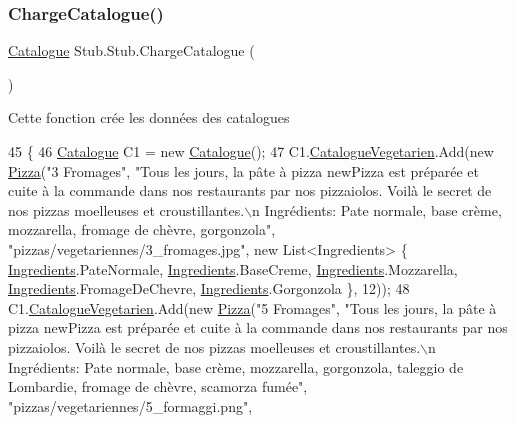 \subsubsection{\texorpdfstring{Charge\+Catalogue()}{ChargeCatalogue()}}
{\footnotesize\ttfamily \hyperlink{classModele_1_1Catalogue}{Catalogue} Stub.\+Stub.\+Charge\+Catalogue (\begin{DoxyParamCaption}{ }\end{DoxyParamCaption})\hspace{0.3cm}{\ttfamily [inline]}}



Cette fonction crée les données des catalogues 


\begin{DoxyCode}
45         \{
46             \hyperlink{classModele_1_1Catalogue}{Catalogue} C1 = \textcolor{keyword}{new} \hyperlink{classModele_1_1Catalogue}{Catalogue}();
47             C1.\hyperlink{classModele_1_1Catalogue_abd7d6d70ddd6ba264c1c91a5b084d9ba}{CatalogueVegetarien}.Add(\textcolor{keyword}{new} \hyperlink{classModele_1_1Pizza}{Pizza}(\textcolor{stringliteral}{"3 Fromages"}, \textcolor{stringliteral}{"Tous les jours, la
       pâte à pizza newPizza est préparée et cuite à la commande dans nos restaurants par nos pizzaiolos. Voilà le
       secret de nos pizzas moelleuses et croustillantes.\(\backslash\)n Ingrédients: Pate normale, base crème, mozzarella,
       fromage de chèvre, gorgonzola"}, \textcolor{stringliteral}{"pizzas/vegetariennes/3\_fromages.jpg"}, \textcolor{keyword}{new} List<Ingredients> \{ 
      \hyperlink{namespaceModele_a001a8e89e56a724f24a249ba98080d41}{Ingredients}.PateNormale, \hyperlink{namespaceModele_a001a8e89e56a724f24a249ba98080d41}{Ingredients}.BaseCreme, 
      \hyperlink{namespaceModele_a001a8e89e56a724f24a249ba98080d41}{Ingredients}.Mozzarella, \hyperlink{namespaceModele_a001a8e89e56a724f24a249ba98080d41}{Ingredients}.FromageDeChevre, 
      \hyperlink{namespaceModele_a001a8e89e56a724f24a249ba98080d41}{Ingredients}.Gorgonzola \}, 12));
48             C1.\hyperlink{classModele_1_1Catalogue_abd7d6d70ddd6ba264c1c91a5b084d9ba}{CatalogueVegetarien}.Add(\textcolor{keyword}{new} \hyperlink{classModele_1_1Pizza}{Pizza}(\textcolor{stringliteral}{"5 Fromages"}, \textcolor{stringliteral}{"Tous les jours, la
       pâte à pizza newPizza est préparée et cuite à la commande dans nos restaurants par nos pizzaiolos. Voilà le
       secret de nos pizzas moelleuses et croustillantes.\(\backslash\)n Ingrédients: Pate normale, base crème, mozzarella,
       gorgonzola, taleggio de Lombardie, fromage de chèvre, scamorza fumée"}, \textcolor{stringliteral}{"pizzas/vegetariennes/5\_formaggi.png"}, \textcolor{keyword}{
}
\end{DoxyCode}
